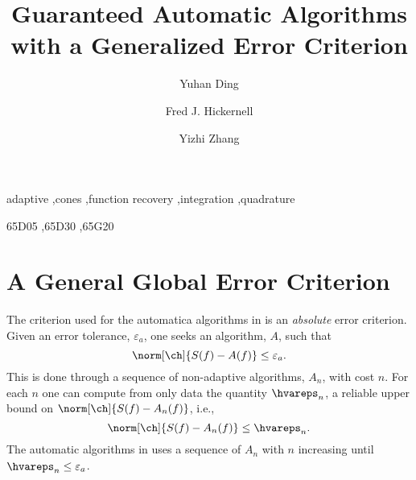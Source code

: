 \documentclass[]{elsarticle}
\theoremstyle{definition}
\theoremstyle{remark}
\begin{document}
\begin{frontmatter}

\title{Guaranteed Automatic Algorithms with a Generalized Error Criterion}
\author{Yuhan Ding}
\author{Fred J. Hickernell}
\author{Yizhi Zhang}
\address{Room E1-208, Department of Applied Mathematics, Illinois Institute of Technology,\\ 10 W.\ 32$^{\text{nd}}$ St., Chicago, IL 60616}
\begin{abstract}
\end{abstract}

\begin{keyword}
adaptive \sep cones \sep function recovery \sep integration \sep quadrature

\MSC[2010] 65D05 \sep 65D30 \sep 65G20

\end{keyword}
\end{frontmatter}


\section{A General Global Error Criterion} \label{globalerrsec}

The criterion used for the automatica algorithms in \cite{HicEtal14b} is an \emph{absolute} error criterion. Given an error tolerance, $\varepsilon_a$, one seeks an algorithm, $A$, such that
\begin{equation} \label{abserrcrit}
\norm[\ch]{S(f)-A(f)} \le \varepsilon_a.
\end{equation}
This is done through a sequence of non-adaptive algorithms, $A_n$, with cost $n$.  For each $n$ one can compute from only data the quantity $\hvareps_n$, a reliable upper bound on $\norm[\ch]{S(f)-A_n(f)}$, i.e.,
\begin{equation} \label{hatvareps}
\norm[\ch]{S(f)-A_n(f)} \le \hvareps_n.
\end{equation}
The automatic algorithms in \cite{HicEtal14b} uses a sequence of $A_n$ with $n$ increasing until $\hvareps_n \le \varepsilon_a$.
\end{document}

